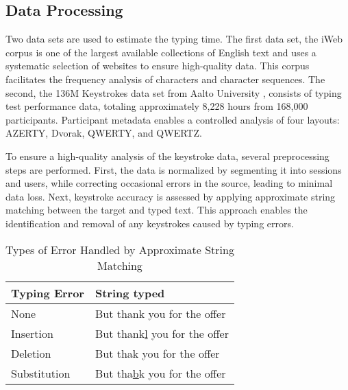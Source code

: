 \subsection{Data Processing}
Two data sets are used to estimate the typing time. The first data set, the iWeb corpus \citep{iweb} is one of the largest available collections of English text and uses a systematic selection of websites to ensure high-quality data. This corpus facilitates the frequency analysis of characters and character sequences. The second, the 136M Keystrokes data set from Aalto University \citep{dhakal2018observations}, consists of typing test performance data, totaling approximately 8,228 hours from 168,000 participants. Participant metadata enables a controlled analysis of four layouts: AZERTY, Dvorak, QWERTY, and QWERTZ.


To ensure a high-quality analysis of the keystroke data, several preprocessing steps are performed. First, the data is normalized by segmenting it into sessions and users, while correcting occasional errors in the source, leading to minimal data loss. Next, keystroke accuracy is assessed by applying approximate string matching between the target and typed text. This approach enables the identification and removal of any keystrokes caused by typing errors.


\begin{table}[h]
\caption{Types of Error Handled by Approximate String Matching}
\begin{center}
\begin{tabular}{l|l}
Typing Error & String typed \\ \hline
None & But thank you for the offer \\
Insertion      & But thank\underline{l} you for the offer                     \\
Deletion       & But tha\underline{\hspace{0.2em}}k you for the offer                       \\
Substitution   & But tha\underline{b}k you for the offer                      \\
\end{tabular}
\end{center}
\label{fig:typing_errors}
\end{table}

